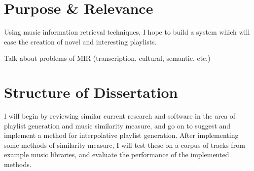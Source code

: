 \section{Purpose \& Relevance}
Using music information retrieval techniques, I hope to build a system which will ease the creation of novel and interesting playlists.

Talk about problems of MIR (transcription, cultural, semantic, etc.)
\section{Structure of Dissertation}
I will begin by reviewing similar current research and software in the area of playlist generation and music similarity measure, and go on to suggest and implement a method for interpolative playlist generation. After implementing some methods of similarity measure, I will test these on a corpus of tracks from example music libraries, and evaluate the performance of the implemented methods.
